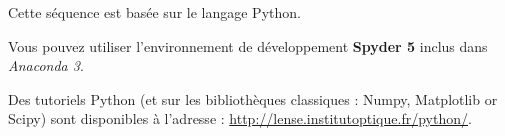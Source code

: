 Cette séquence est basée sur le langage Python.

Vous pouvez utiliser %
l'environnement de développement \textbf{Spyder 5} inclus dans \textit{Anaconda 3}.

Des tutoriels Python (et sur les bibliothèques classiques : Numpy, Matplotlib or Scipy) sont disponibles à l'adresse : \href{http://lense.institutoptique.fr/python/}{http://lense.institutoptique.fr/python/}. 
